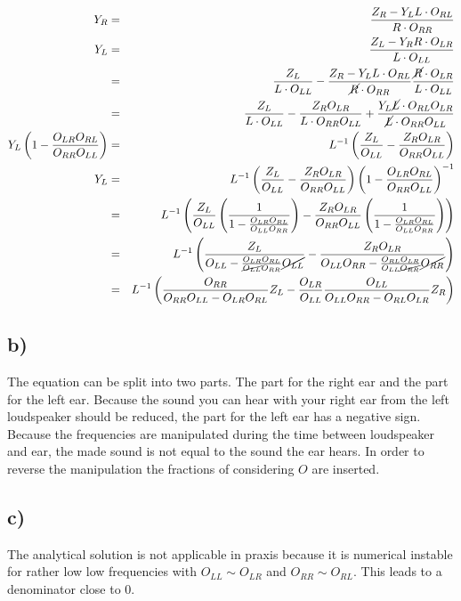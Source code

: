 \documentclass[10pt]{article}
\begin{document}
      \begin{eqnarray}
          Y_{R}&=&\frac{Z_{R}-Y_{L} L\cdot O_{RL}}{R\cdot O_{RR}} \\
          Y_{L}&=&\frac{Z_{L}-Y_{R} R\cdot O_{LR}}{L\cdot O_{LL}} \\
           &=&
            \frac{Z_{L}}{L\cdot O_{LL}} - \frac{Z_{R}-Y_{L} L\cdot
            O_{RL}}{\cancel{R} \cdot O_{RR}} \frac{\cancel{R}\cdot O_{LR}}{L\cdot O_{LL}} \\
           &=&
            \frac{Z_{L}}{L\cdot O_{LL}}-
            \frac{Z_{R}O_{LR}}{L\cdot O_{RR} O_{LL}}+
            \frac{Y_{L} \cancel{L}\cdot O_{RL}O_{LR}}{\cancel{L}\cdot
            O_{RR}O_{LL}} \\
          Y_{L}\left( 1-\frac{O_{LR}O_{RL}}{O_{RR}O_{LL}} \right) &=&
          L^{-1}\left( \frac{Z_{L}}{O_{LL}} -\frac{Z_{R}O_{LR}}{O_{RR}O_{LL}}\right) \\
          Y_{L}&=&
          L^{-1}\left( \frac{Z_{L}}{O_{LL}} -\frac{Z_{R}O_{LR}}{O_{RR}O_{LL}}\right)
            \left( 1-\frac{O_{LR}O_{RL}}{O_{RR}O_{LL}} \right)^{-1} \\
          &=&
            L^{-1}\left( \frac{Z_{L}}{O_{LL}}
            \left(\frac{1}{1-\frac{O_{LR}O_{RL}}{O_{LL}O_{RR}}}\right)
            -\frac{Z_{R}O_{LR}}{O_{RR}O_{LL}} 
            \left(\frac{1}{1-\frac{O_{LR}O_{RL}}{O_{LL}O_{RR}}}\right)
            \right) \\
          &=&
            L^{-1}\left(
            \frac{Z_{L}}{O_{LL}-\frac{O_{LR}O_{RL}}{\cancel{O_{LL}}O_{RR}}\cancel{O_{LL}}}
            -\frac{Z_{R}O_{LR}}{O_{LL}O_{RR}-\frac{O_{RL}O_{LR}}{O_{LL}
            \cancel{O_{RR}}}\cancel{O_{RR}}}
            \right) \\
          &=& L^{-1} \left(
            \frac{O_{RR}}{O_{RR}O_{LL}-O_{LR}O_{RL}}Z_{L}
            -\frac{O_{LR}}{O_{LL}}\frac{O_{LL}}{O_{LL}O_{RR}-O_{RL}O_{LR}}Z_{R}
          \right)
      \end{eqnarray}

    \subsection*{b)}
      The equation can be split into two parts. The part for the right ear and
      the part for the left ear. Because the sound you can hear with your right
      ear from the left loudspeaker should be reduced, the part for the left ear
      has a negative sign. Because the frequencies are manipulated during the
      time between loudspeaker and ear, the made sound is not equal to the sound
      the ear hears. In order to reverse the manipulation the fractions of
      considering $O$ are inserted.
      

    \subsection*{c)}
      The analytical solution is not applicable in praxis because it is
      numerical instable for rather low low frequencies with $O_{LL}\sim O_{LR}$
      and $O_{RR}\sim O_{RL}$. This leads to a denominator close to $0$.
\end{document}
